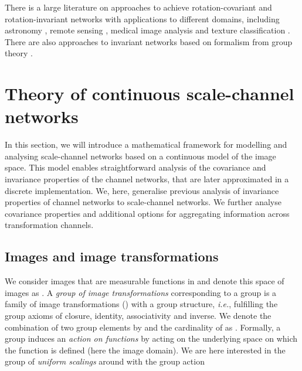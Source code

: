 \documentclass[twocolumn,runningheads]{svjour3}
\begin{document}
There is a large literature on approaches to achieve
rotation-covariant and rotation-invariant networks
\cite{DieFauKav16-ICML,LapSavBuhPol16-CVPR,WorGarTurBro17-CVPR,ZhoYeQiuJia17-CVPR,MarVolKomTui17-ICCV,CohWel17-ICLR,WeiGeiWelBooCoh18-NIPS,WeiHamSto18-CVPR,WorBro18-ECCV,CheHanZhoXu18-IP}
with applications to different domains, including astronomy
\cite{DieWilDam15-RoyAstro},
remote sensing \cite{CheZhoHan17-GeoRemoteSens},
medical image analysis
\cite{WanZheYanJinCheYin17-TBiomedHealth,BekLafVetEppPluDui18-MICCAI,LafBekPluDuiVet20-MedImAnal} 
and texture classification \cite{AndDep18-arXiv}.
There are also approaches to invariant networks based on formalism from
group theory \cite{CohWel16-ICML,PogAns16-book,KonTri18-ICML}.


\section{Theory of continuous scale-channel networks}
\label{sec-theory}

In this section, we will introduce a mathematical framework for
modelling and analysing scale-channel networks based on a continuous
model of the image space. This model enables straightforward analysis
of the covariance and invariance properties of the channel networks,
that are later approximated in a discrete implementation. We, here,
generalise previous analysis of invariance properties of channel
networks \cite{LapSavBuhPol16-CVPR} to scale-channel networks. We
further analyse covariance properties and additional options for
aggregating information across transformation channels. 
 
\subsection{Images and image transformations}

We consider images  that are measurable functions in  and denote this space of images as . 
A \emph{group of image transformations} corresponding to a group 
is a family of image transformations  () with a
group structure, {\em i.e.\/}, fulfilling the group axioms of closure, identity, associativity and inverse.
We denote the combination of two group elements  by  and the cardinality of  as . 
Formally, a group  induces an \emph{action on functions} by acting on the underlying space on which the function is defined (here the image domain). We are here  interested in the group of \emph{uniform scalings} around  with the group action
\end{document}
